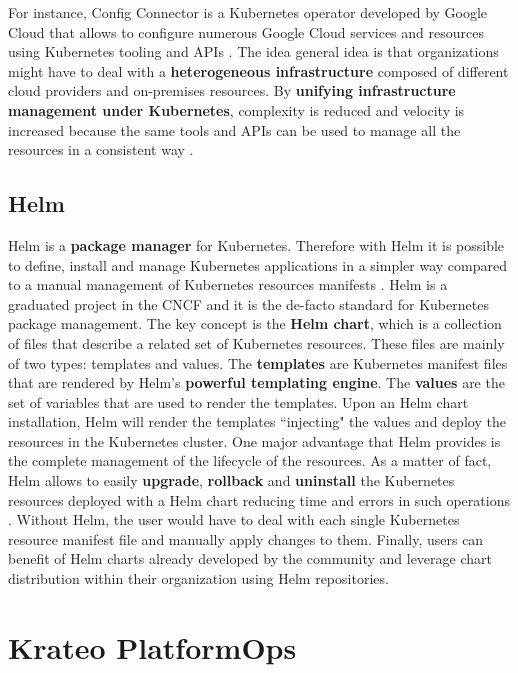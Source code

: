 For instance, Config Connector is a Kubernetes operator developed by Google Cloud that allows to configure numerous Google Cloud services and resources using Kubernetes tooling and APIs \cite{gcp_config_connector}.
The idea general idea is that organizations might have to deal with a \textbf{heterogeneous infrastructure} composed of different cloud providers and on-premises resources. 
By \textbf{unifying infrastructure management under Kubernetes}, complexity is reduced and velocity is increased because the same tools and APIs can be used to manage all the resources in a consistent way \cite{gcp_config_connector}.



\subsection{Helm}

Helm is a \textbf{package manager} for Kubernetes. Therefore with Helm it is possible to define, install and manage Kubernetes applications in a simpler way compared to a manual management of Kubernetes resources manifests \cite{helm}.
Helm is a graduated project in the CNCF and it is the de-facto standard for Kubernetes package management.
The key concept is the \textbf{Helm chart}, which is a collection of files that describe a related set of Kubernetes resources. 
These files are mainly of two types: templates and values.
The \textbf{templates} are Kubernetes manifest files that are rendered by Helm's \textbf{powerful templating engine}. 
The \textbf{values} are the set of variables that are used to render the templates.
Upon an Helm chart installation, Helm will render the templates ``injecting" the values and deploy the resources in the Kubernetes cluster. 
One major advantage that Helm provides is the complete management of the lifecycle of the resources.
As a matter of fact, Helm allows to easily \textbf{upgrade}, \textbf{rollback} and \textbf{uninstall} the Kubernetes resources deployed with a Helm chart reducing time and errors in such operations \cite{helm}. 
Without Helm, the user would have to deal with each single Kubernetes resource manifest file and manually apply changes to them.
Finally, users can benefit of Helm charts already developed by the community and leverage chart distribution within their organization using Helm repositories.

\section{Krateo PlatformOps}
\label{sec:krateo}

